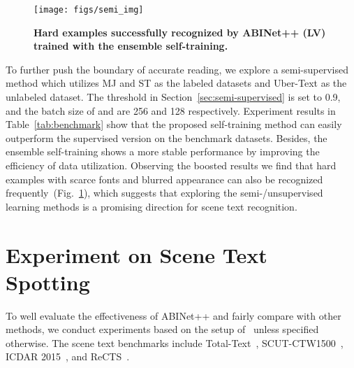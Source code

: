 \documentclass[10pt,journal,compsoc]{IEEEtran}
\begin{document}
\begin{figure}
   \begin{center}
      \texttt{[image: figs/semi\_img]}
      \caption{\textbf{Hard examples successfully recognized by ABINet++ (LV) trained with the ensemble self-training.}}
      \label{fig:semi_img}
   \end{center}
   \vspace{-2em}
\end{figure}


To further push the boundary of accurate reading, we explore a semi-supervised method which utilizes MJ and ST as the labeled datasets and Uber-Text as the unlabeled dataset. The threshold  in Section~\ref{sec:semi-supervised} is set to 0.9, and the batch size of  and  are 256 and 128 respectively. Experiment results in Table~\ref{tab:benchmark} show that the proposed self-training method can easily outperform the supervised version on the benchmark datasets. Besides, the ensemble self-training shows a more stable performance by improving the efficiency of data utilization. Observing the boosted results we find that hard examples with scarce fonts and blurred appearance can also be recognized frequently~(Fig.~\ref{fig:semi_img}), which suggests that exploring the semi-/unsupervised learning methods is a promising direction for scene text recognition. 


\section{Experiment on Scene Text Spotting}

To well evaluate the effectiveness of ABINet++ and fairly compare with other methods, we conduct experiments based on the setup of~\cite{liu2020abcnetv2,liu2020abcnet} unless specified otherwise. The scene text benchmarks include Total-Text~\cite{ch2020total}, SCUT-CTW1500~\cite{liu2019curved}, ICDAR 2015~\cite{karatzas2015icdar}, and ReCTS~\cite{zhang2019icdar}.
\end{document}
